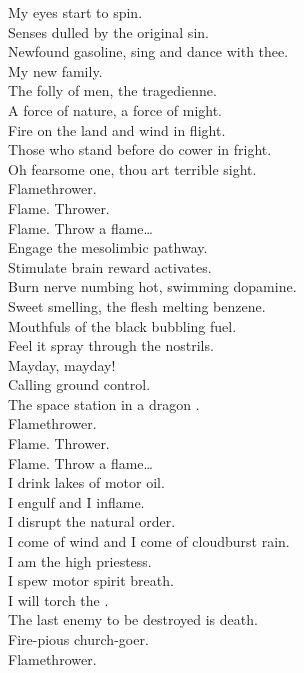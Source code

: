 My eyes start to spin. \\
Senses dulled by the original sin. \\
Newfound gasoline, sing and dance with thee. \\
My new family. \\
The folly of men, the tragedienne. \\
A force of nature, a force of might. \\
Fire on the land and wind in flight. \\
Those who stand before do cower in fright. \\
Oh fearsome one, thou art terrible sight. \\

Flamethrower. \\
Flame. Thrower. \\
Flame. Throw a flame… \\

Engage the mesolimbic pathway. \\
Stimulate brain reward activates. \\
Burn nerve numbing hot, swimming dopamine. \\
Sweet smelling, the flesh melting benzene. \\
Mouthfuls of the black bubbling fuel. \\
Feel it spray through the  nostrils. \\
Mayday, mayday! \\
Calling ground control. \\
The space station in a dragon . \\

Flamethrower. \\
Flame. Thrower. \\
Flame. Throw a flame… \\

I drink lakes of motor oil. \\
I engulf and I inflame. \\
I disrupt the natural order. \\
I come of wind and I come of cloudburst rain. \\
I am the high priestess. \\
I spew motor spirit breath. \\
I will torch the . \\
The last enemy to be destroyed is death. \\
Fire-pious church-goer. \\
Flamethrower. \\

